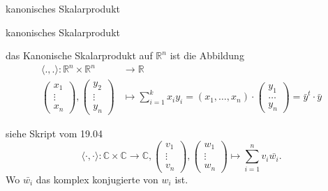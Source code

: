 \documentclass[class=article, crop=false]{standalone}
\begin{document}
\begin{zettel}{kanonisches Skalarprodukt}
\begin{flashcard}[7rvb3gk4]{kanonisches Skalarprodukt}
	\begin{definition}
		das Kanonische Skalarprodukt auf $\mathbb{R}^n $  ist die Abbildung
		\begin{align*}
			\langle .,.\rangle : \mathbb{R}^n \times \mathbb{R}^n                                                                  & \longrightarrow \mathbb{R}                                                                                                                           \\
			\begin{pmatrix}x_1\\ \vdots\\ x_n\end{pmatrix}, \begin{pmatrix}y_2\\ \vdots\\ y_n\end{pmatrix} & \mapsto \sum_{i = 1}^{k} x_i  y_i  = (x_1 , \dots , x_n ) \cdot \begin{pmatrix}y_1\\ \dots\\ y_n\end{pmatrix}  = \bar{y}^t \cdot \bar{y}
		\end{align*}
	\end{definition}
\end{flashcard}


\begin{flashcard}[40po2j06]{}
	\begin{definition}
		siehe Skript vom 19.04
		\[
			\langle \cdot,\cdot\rangle : \mathbb{C} \times \mathbb{C} \longrightarrow  \mathbb{C}, \begin{pmatrix}v_1 \\ \vdots \\ v_n\end{pmatrix}, \begin{pmatrix}w_1 \\ \vdots \\ w_n\end{pmatrix} \mapsto \sum_{i = 1}^{n} v_i \bar{w_i}
		.\]
		Wo $ \bar{w_i} $ das komplex konjugierte von $w_i $ ist.
	\end{definition}
\end{flashcard}
\end{zettel}
\end{document}
